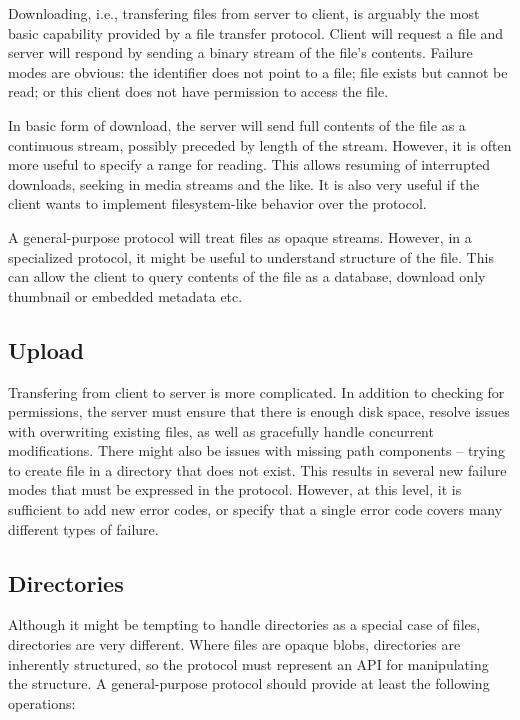 Downloading, i.e., transfering files from server to client, is arguably the most basic capability provided by
a file transfer protocol. Client will request a file and server will respond by sending a binary stream of the
file's contents. Failure modes are obvious: the identifier does not point to a file; file exists but cannot be
read; or this client does not have permission to access the file.

In basic form of download, the server will send full contents of the file as a continuous stream, possibly
preceded by length of the stream. However, it is often more useful to specify a range for reading. This allows
resuming of interrupted downloads, seeking in media streams and the like. It is also very useful if the client
wants to implement filesystem-like behavior over the protocol.

A general-purpose protocol will treat files as opaque streams. However, in a specialized protocol, it might be
useful to understand structure of the file. This can allow the client to query contents of the file as
a database, download only thumbnail or embedded metadata etc.

\subsection{Upload}

Transfering from client to server is more complicated. In addition to checking for permissions, the server
must ensure that there is enough disk space, resolve issues with overwriting existing files, as well as
gracefully handle concurrent modifications. There might also be issues with missing path components -- trying
to create file in a directory that does not exist. This results in several new failure modes that must be
expressed in the protocol. However, at this level, it is sufficient to add new error codes, or specify that
a single error code covers many different types of failure.

\subsection{Directories}

Although it might be tempting to handle directories as a special case of files, directories are very
different. Where files are opaque blobs, directories are inherently structured, so the protocol must represent
an API for manipulating the structure. A general-purpose protocol should provide at least the following
operations:

